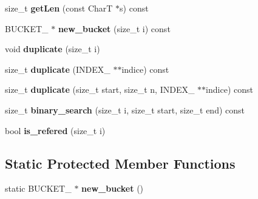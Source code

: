 \begin{CompactItemize}
\item 
\hypertarget{classbbt__string_ec3984725d5acba737b35a86c830557c}{
size\_\-t \textbf{getLen} (const CharT $\ast$s) const }
\label{classbbt__string_ec3984725d5acba737b35a86c830557c}

\item 
\hypertarget{classbbt__string_a94c731e1b5f193b902efb470f90b811}{
BUCKET\_\- $\ast$ \textbf{new\_\-bucket} (size\_\-t i) const }
\label{classbbt__string_a94c731e1b5f193b902efb470f90b811}

\item 
\hypertarget{classbbt__string_4f3ee2c9657c4b817b763cd0fed7cdfd}{
void \textbf{duplicate} (size\_\-t i)}
\label{classbbt__string_4f3ee2c9657c4b817b763cd0fed7cdfd}

\item 
\hypertarget{classbbt__string_f97a1811c1ff2df4682db4dea4f34b0a}{
size\_\-t \textbf{duplicate} (INDEX\_\- $\ast$$\ast$indice) const }
\label{classbbt__string_f97a1811c1ff2df4682db4dea4f34b0a}

\item 
\hypertarget{classbbt__string_f6fde6bef4354adfc8e1744e97f686a2}{
size\_\-t \textbf{duplicate} (size\_\-t start, size\_\-t n, INDEX\_\- $\ast$$\ast$indice) const }
\label{classbbt__string_f6fde6bef4354adfc8e1744e97f686a2}

\item 
\hypertarget{classbbt__string_4d1bca27e60258f0f9709e2b67c7ac8c}{
size\_\-t \textbf{binary\_\-search} (size\_\-t i, size\_\-t start, size\_\-t end) const }
\label{classbbt__string_4d1bca27e60258f0f9709e2b67c7ac8c}

\item 
\hypertarget{classbbt__string_badb9ff60544a1a510b813eb73ea28b1}{
bool \textbf{is\_\-refered} (size\_\-t i)}
\label{classbbt__string_badb9ff60544a1a510b813eb73ea28b1}

\end{CompactItemize}
\subsection*{Static Protected Member Functions}
\begin{CompactItemize}
\item 
\hypertarget{classbbt__string_ba4af9958273381c33fd7eb02601ee04}{
static BUCKET\_\- $\ast$ \textbf{new\_\-bucket} ()}
\label{classbbt__string_ba4af9958273381c33fd7eb02601ee04}

\end{CompactItemize}
